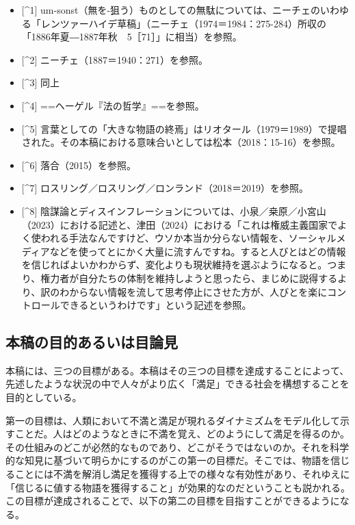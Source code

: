 \begin{itemize}
\tightlist
\item
  {[}\^{}1{]}
  um-sonst（無を-狙う）ものとしての無駄については、ニーチェのいわゆる「レンツァーハイデ草稿」（ニーチェ（1974＝1984：275-284）所収の「1886年夏―1887年秋　5［71］」に相当）を参照。
\item
  {[}\^{}2{]} ニーチェ（1887＝1940：271）を参照。
\item
  {[}\^{}3{]} 同上
\item
  {[}\^{}4{]} ==ヘーゲル『法の哲学』==を参照。
\item
  {[}\^{}5{]}
  言葉としての「大きな物語の終焉」はリオタール（1979＝1989）で提唱された。その本稿における意味合いとしては松本（2018：15-16）を参照。
\item
  {[}\^{}6{]} 落合（2015）を参照。
\item
  {[}\^{}7{]} ロスリング／ロスリング／ロンランド（2018＝2019）を参照。
\item
  {[}\^{}8{]}
  陰謀論とディスインフレーションについては、小泉／桒原／小宮山（2023）における記述と、津田（2024）における「これは権威主義国家でよく使われる手法なんですけど、ウソか本当か分らない情報を、ソーシャルメディアなどを使ってとにかく大量に流すんですね。すると人びとはどの情報を信じればよいかわからず、変化よりも現状維持を選ぶようになると。つまり、権力者が自分たちの体制を維持しようと思ったら、まじめに説得するより、訳のわからない情報を流して思考停止にさせた方が、人びとを楽にコントロールできるというわけです」という記述を参照。
\end{itemize}

\subsection{本稿の目的あるいは目論見}\label{ux672cux7a3fux306eux76eeux7684ux3042ux308bux3044ux306fux76eeux8ad6ux898b}

本稿には、三つの目標がある。本稿はその三つの目標を達成することによって、先述したような状況の中で人々がより広く「満足」できる社会を構想することを目的としている。

第一の目標は、人類において不満と満足が現れるダイナミズムをモデル化して示すことだ。人はどのようなときに不満を覚え、どのようにして満足を得るのか。その仕組みのどこが必然的なものであり、どこがそうではないのか。それを科学的な知見に基づいて明らかにするのがこの第一の目標だ。そこでは、物語を信じることには不満を解消し満足を獲得する上での様々な有効性があり、それゆえに「信じるに値する物語を獲得すること」が効果的なのだということも説かれる。この目標が達成されることで、以下の第二の目標を目指すことができるようになる。

